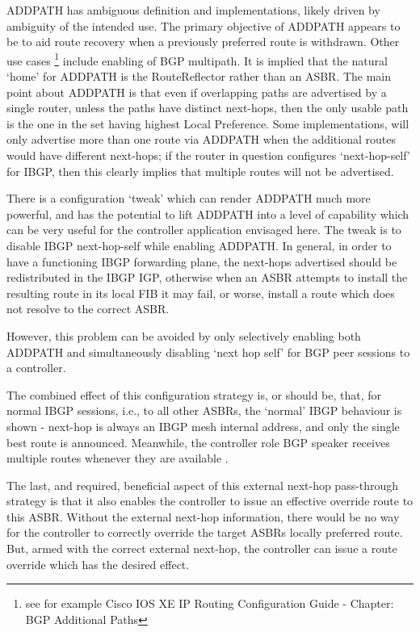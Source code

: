 ADDPATH has ambiguous definition and implementations, likely driven by ambiguity of the intended use.  The primary objective of ADDPATH appears to be to aid route recovery when a previously preferred route is withdrawn.  Other use cases \footnote{see for example Cisco IOS XE IP Routing Configuration Guide - Chapter: BGP Additional Paths} include enabling of BGP multipath.  It is implied that the natural `home' for ADDPATH is the RouteReflector rather than an ASBR.   The main point about ADDPATH is that even if overlapping paths are advertised by a single router, unless the paths have distinct next-hops, then the only usable path is the one in the set having highest Local Preference. Some implementations, will only advertise more than one route via ADDPATH when the additional routes would have different next-hops; if the router in question configures `next-hop-self' for IBGP, then this clearly implies that multiple routes will not be advertised.

There is a configuration `tweak' which can render ADDPATH much more powerful, and has the potential to lift ADDPATH into a level of capability which can be very useful for the controller application envisaged here.  The tweak is to disable IBGP next-hop-self while enabling ADDPATH.  In general, in order to have a functioning IBGP forwarding plane, the next-hops advertised should be redistributed in the IBGP IGP, otherwise when an ASBR attempts to install the resulting route in its local FIB it may fail, or worse, install a route which does not resolve to the correct ASBR.

However, this problem can be avoided by only selectively enabling both ADDPATH and simultaneously disabling `next hop self' for BGP peer sessions to a controller.

The combined effect of this configuration strategy is, or should be, that, for normal IBGP sessions, i.e., to all other ASBRs, the `normal' IBGP behaviour is shown - next-hop is always an IBGP mesh internal address, and only the single best route is announced.  Meanwhile, the controller role BGP speaker receives multiple routes whenever they are available .

The last, and required, beneficial aspect of this external next-hop pass-through strategy is that it also enables the controller to issue an effective override route to this ASBR.  Without the external next-hop information, there would be no way for the controller to correctly override the target ASBRs locally preferred route.  But, armed with the correct external next-hop, the controller can  issue a route override which has the desired effect.

